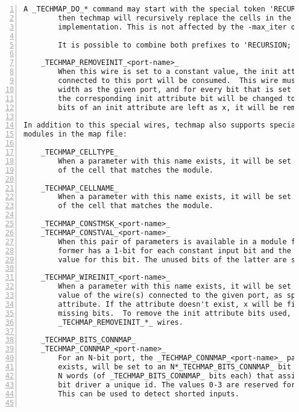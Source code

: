 \begin{lstlisting}[numbers=left,frame=single]
        A _TECHMAP_DO_* command may start with the special token 'RECURSION; '.
        then techmap will recursively replace the cells in the module with their
        implementation. This is not affected by the -max_iter option.

        It is possible to combine both prefixes to 'RECURSION; CONSTMAP; '.

    _TECHMAP_REMOVEINIT_<port-name>_
        When this wire is set to a constant value, the init attribute of the wire(s)
        connected to this port will be consumed.  This wire must have the same
        width as the given port, and for every bit that is set to 1 in the value,
        the corresponding init attribute bit will be changed to 1'bx.  If all
        bits of an init attribute are left as x, it will be removed.

In addition to this special wires, techmap also supports special parameters in
modules in the map file:

    _TECHMAP_CELLTYPE_
        When a parameter with this name exists, it will be set to the type name
        of the cell that matches the module.

    _TECHMAP_CELLNAME_
        When a parameter with this name exists, it will be set to the name
        of the cell that matches the module.

    _TECHMAP_CONSTMSK_<port-name>_
    _TECHMAP_CONSTVAL_<port-name>_
        When this pair of parameters is available in a module for a port, then
        former has a 1-bit for each constant input bit and the latter has the
        value for this bit. The unused bits of the latter are set to undef (x).

    _TECHMAP_WIREINIT_<port-name>_
        When a parameter with this name exists, it will be set to the initial
        value of the wire(s) connected to the given port, as specified by the init
        attribute. If the attribute doesn't exist, x will be filled for the
        missing bits.  To remove the init attribute bits used, use the
        _TECHMAP_REMOVEINIT_*_ wires.

    _TECHMAP_BITS_CONNMAP_
    _TECHMAP_CONNMAP_<port-name>_
        For an N-bit port, the _TECHMAP_CONNMAP_<port-name>_ parameter, if it
        exists, will be set to an N*_TECHMAP_BITS_CONNMAP_ bit vector containing
        N words (of _TECHMAP_BITS_CONNMAP_ bits each) that assign each single
        bit driver a unique id. The values 0-3 are reserved for 0, 1, x, and z.
        This can be used to detect shorted inputs.


\end{lstlisting}
